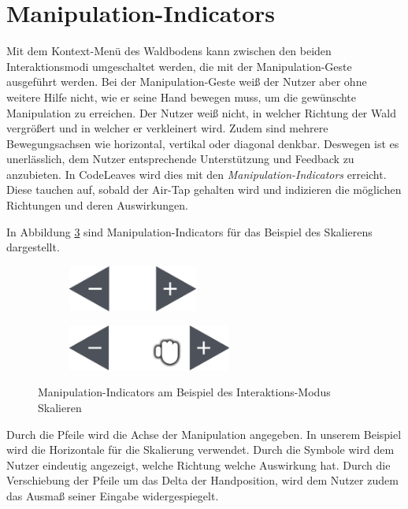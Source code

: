 \section{Manipulation-Indicators}
\label{subsec:manipulation-indicators}
Mit dem Kontext-Menü des Waldbodens kann zwischen den beiden Interaktionsmodi umgeschaltet werden, die mit der Manipulation-Geste ausgeführt werden. Bei der Manipulation-Geste weiß der Nutzer aber ohne weitere Hilfe nicht, wie er seine Hand bewegen muss, um die gewünschte Manipulation zu erreichen. Der Nutzer weiß nicht, in welcher Richtung der Wald vergrößert und in welcher er verkleinert wird. Zudem sind mehrere Bewegungsachsen wie horizontal, vertikal oder diagonal denkbar. Deswegen ist es unerlässlich, dem Nutzer entsprechende Unterstützung und Feedback zu anzubieten. In CodeLeaves wird dies mit den \textit{Manipulation-Indicators} erreicht. Diese tauchen auf, sobald der Air-Tap gehalten wird und indizieren die möglichen Richtungen und deren Auswirkungen.

In Abbildung \ref{fig:manipulation} sind Manipulation-Indicators für das Beispiel des Skalierens dargestellt.

\begin{figure}[htb]
  \centering
  \begin{subfigure}[t]{\fwidth}
    \centering
    \includegraphics[height=1.5cm]{figures/manipulation}
     \label{fig:manipulation}
  \end{subfigure}
  \begin{subfigure}[t]{\fwidth}
    \centering
  	\includegraphics[height=1.5cm]{figures/manipulation-drag}
  	 \label{fig:manipulation-drag}
  \end{subfigure}
  \caption{Manipulation-Indicators am Beispiel des Interaktions-Modus Skalieren} \label{fig:manipulation}
\end{figure}

Durch die Pfeile wird die Achse der Manipulation angegeben. In unserem Beispiel wird die Horizontale für die Skalierung verwendet. Durch die Symbole wird dem Nutzer eindeutig angezeigt, welche Richtung welche Auswirkung hat. Durch die Verschiebung der Pfeile um das Delta der Handposition, wird dem Nutzer zudem das Ausmaß seiner Eingabe widergespiegelt.

